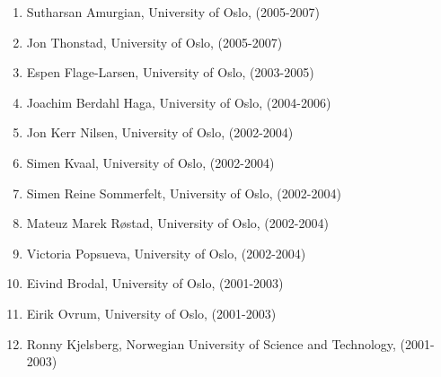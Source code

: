 \documentclass[%
oneside,                 %
final,                   %
10pt]{article}
\begin{document}
\begin{enumerate}
\item Sutharsan Amurgian, University of Oslo, (2005-2007)

\item Jon Thonstad, University of Oslo, (2005-2007)

\item Espen Flage-Larsen, University of Oslo, (2003-2005)

\item Joachim Berdahl Haga, University of Oslo, (2004-2006)

\item Jon Kerr Nilsen, University of Oslo, (2002-2004)

\item Simen Kvaal, University of Oslo, (2002-2004)

\item Simen Reine Sommerfelt, University of Oslo, (2002-2004)

\item Mateuz Marek Røstad, University of Oslo, (2002-2004)

\item Victoria Popsueva, University of Oslo, (2002-2004)

\item Eivind Brodal, University of Oslo, (2001-2003)

\item Eirik Ovrum, University of Oslo, (2001-2003)

\item Ronny Kjelsberg, Norwegian University of Science and Technology, (2001-2003)
\end{enumerate}

\noindent
\end{document}
